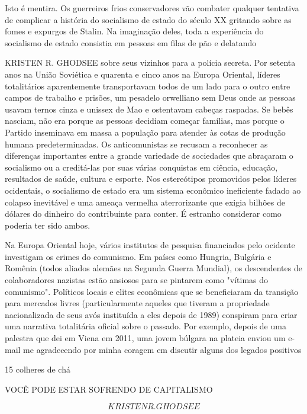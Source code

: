  \par 
Isto é mentira. Os guerreiros frios conservadores vão combater qualquer tentativa de complicar a história do socialismo de estado do século XX gritando sobre as fomes e expurgos de Stalin. Na imaginação deles, toda a experiência do socialismo de estado consistia em pessoas em filas de pão e delatando
 \par 
KRISTEN R. GHODSEE sobre seus vizinhos para a polícia secreta. Por setenta anos na União Soviética e quarenta e cinco anos na Europa Oriental, líderes totalitários aparentemente transportavam todos de um lado para o outro entre campos de trabalho e prisões, um pesadelo orwelliano sem Deus onde as pessoas usavam ternos cinza e unissex de Mao e ostentavam cabeças raspadas. Se bebês nasciam, não era porque as pessoas decidiam começar famílias, mas porque o Partido inseminava em massa a população para atender às cotas de produção humana predeterminadas. Os anticomunistas se recusam a reconhecer as diferenças importantes entre a grande variedade de sociedades que abraçaram o socialismo ou a creditá-las por suas várias conquistas em ciência, educação, resultados de saúde, cultura e esporte. Nos estereótipos promovidos pelos líderes ocidentais, o socialismo de estado era um sistema econômico ineficiente fadado ao colapso inevitável e uma ameaça vermelha aterrorizante que exigia bilhões de dólares do dinheiro do contribuinte para conter. É estranho considerar como poderia ter sido ambos.
 \par 
Na Europa Oriental hoje, vários institutos de pesquisa financiados pelo ocidente investigam os crimes do comunismo. Em países como Hungria, Bulgária e Romênia (todos aliados alemães na Segunda Guerra Mundial), os descendentes de colaboradores nazistas estão ansiosos para se pintarem como "vítimas do comunismo". Políticos locais e elites econômicas que se beneficiaram da transição para mercados livres (particularmente aqueles que tiveram a propriedade nacionalizada de seus avós instituída a eles depois de 1989) conspiram para criar uma narrativa totalitária oficial sobre o passado. Por exemplo, depois de uma palestra que dei em Viena em 2011, uma jovem búlgara na plateia enviou um e-mail me agradecendo por minha coragem em discutir alguns dos legados positivos
 \par 
15 colheres de chá
 \par 
VOCÊ PODE ESTAR SOFRENDO DE CAPITALISMO
 \par 
\[KRISTEN R. GHODSEE\]
 \par 

